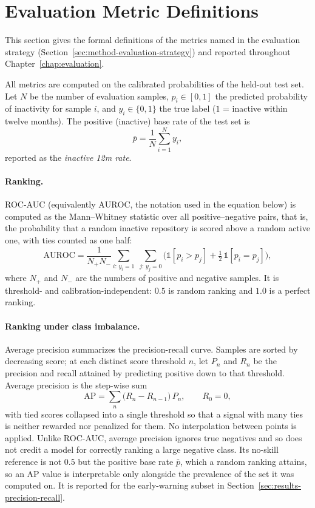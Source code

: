 \section{Evaluation Metric Definitions}
\label{sec:method-metric-definitions}

This section gives the formal definitions of the metrics named in the evaluation
strategy (Section~\ref{sec:method-evaluation-strategy}) and reported throughout
Chapter~\ref{chap:evaluation}.

All metrics are computed on the calibrated probabilities of the held-out test
set. Let \(N\) be the number of evaluation samples, \(p_i \in [0,1]\) the
predicted probability of inactivity for sample \(i\), and \(y_i \in \{0,1\}\) the
true label (\(1\) = inactive within twelve months). The positive (inactive) base
rate of the test set is
\begin{equation}
  \bar{p} = \frac{1}{N}\sum_{i=1}^{N} y_i ,
\end{equation}
reported as the \emph{inactive 12m rate}.

\paragraph{Ranking.} ROC-AUC (equivalently \(\mathrm{AUROC}\), the notation used
in the equation below) is computed as the Mann--Whitney statistic over all
positive--negative pairs, that is, the probability that a random inactive
repository is scored above a random active one, with ties counted as one half:
\begin{equation}
  \mathrm{AUROC} = \frac{1}{N_{+}N_{-}}
    \sum_{i:\,y_i=1}\;\sum_{j:\,y_j=0}
    \Big( \mathbb{1}[p_i > p_j] + \tfrac{1}{2}\,\mathbb{1}[p_i = p_j] \Big),
\end{equation}
where \(N_{+}\) and \(N_{-}\) are the numbers of positive and negative samples.
It is threshold- and calibration-independent: \(0.5\) is random ranking and
\(1.0\) is a perfect ranking.

\paragraph{Ranking under class imbalance.} Average precision summarizes the
precision-recall curve. Samples are sorted by decreasing score; at each distinct
score threshold \(n\), let \(P_n\) and \(R_n\) be the precision and recall
attained by predicting positive down to that threshold. Average precision is the
step-wise sum
\begin{equation}
  \mathrm{AP} = \sum_{n} \big( R_n - R_{n-1} \big)\, P_n , \qquad R_0 = 0 ,
\end{equation}
with tied scores collapsed into a single threshold so that a signal with many
ties is neither rewarded nor penalized for them. No interpolation between points
is applied. Unlike ROC-AUC, average precision ignores true negatives and so does
not credit a model for correctly ranking a large negative class. Its no-skill
reference is not \(0.5\) but the positive base rate \(\bar{p}\), which a random
ranking attains, so an AP value is interpretable only alongside the prevalence of
the set it was computed on. It is reported for the early-warning subset in
Section~\ref{sec:results-precision-recall}.

